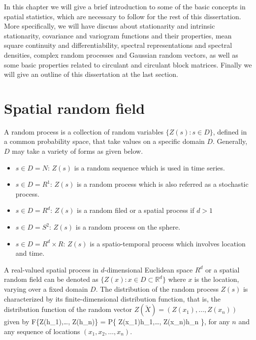 

% 

% 

In this chapter we will give a brief introduction to some of the basic concepts in spatial statistics, which are necessary to follow for the rest of this dissertation. More specifically, we will have discuss about stationarity and intrinsic stationarity, covariance and variogram functions and their properties, mean square continuity and differentiability, spectral representations and spectral densities, complex random processes and Gaussian random vectors, as well as some basic properties related to circulant and circulant block matrices. Finally we will give an outline of this dissertation at the last section. %


\section{Spatial random field}
A random process is a collection of random variables $\{Z(s): s\in D\}$, defined in a common probability space, that take values on a specific domain $D$. Generally, $D$ may take a variety of forms as given below.
\begin{itemize}
	\item $s \in D = N$: $Z(s)$ is a random sequence which is used in time series.
	\item $s \in D = R^1$: $Z(s)$ is a random process which is also referred as a stochastic process.
	\item $s \in D = R^d$: $Z(s)$ is a random filed or a spatial process if $d > 1$
	\item $s \in D = S^2$: $Z(s)$ is a random process on the sphere.
	\item $s \in D = R^d\times R$: $Z(s)$ is a spatio-temporal process which involves location and time.
\end{itemize}

A real-valued spatial process in $d$-dimensional Euclidean space $R^d$ or a spatial random field can be denoted as $\{Z(x): x \in D \subset \mathbb{R}^d\}$ where $x$ is the location, varying over a fixed domain $D$. The distribution of the random process $Z(s)$ is characterized by its finite-dimensional distribution function, that is, the distribution function of the random vector $ Z(\utilde{X})=(Z(x_1),\ldots, Z(x_n) )$ given by
\beq
F\{Z(h_1),\ldots, Z(h_n)\} = P\{ Z(x_1)\le h_1,\ldots, Z(x_n)\le h_n \},
\eeq
for any $n$ and any sequence of locations $(x_1, x_2, \ldots, x_n)$.



